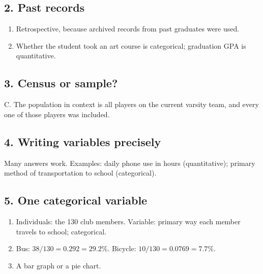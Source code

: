 \documentclass[11pt]{article}
\newcommand{\ans}[1]{\textcolor{AnswerBlue}{#1}}
\begin{document}
\subsection*{2. Past records}
\begin{answerbox}
\begin{enumerate}[label=\alph*.]
  \item \ans{Retrospective, because archived records from past graduates were used.}
  \item \ans{Whether the student took an art course is categorical; graduation GPA is quantitative.}
\end{enumerate}
\end{answerbox}

\subsection*{3. Census or sample?}
\begin{answerbox}
\ans{C.} The population in context is all players on the current varsity team, and every one of those players was included.
\end{answerbox}

\subsection*{4. Writing variables precisely}
\begin{answerbox}
Many answers work. Examples: \ans{daily phone use in hours (quantitative)}; \ans{primary method of transportation to school (categorical)}.
\end{answerbox}

\subsection*{5. One categorical variable}
\begin{answerbox}
\begin{enumerate}[label=\alph*.]
  \item \ans{Individuals: the 130 club members. Variable: primary way each member travels to school; categorical.}
  \item \ans{Bus: $38/130=0.292=29.2\%$. Bicycle: $10/130=0.0769=7.7\%$.}
  \item \ans{A bar graph or a pie chart.}
\end{enumerate}
\end{answerbox}
\end{document}
